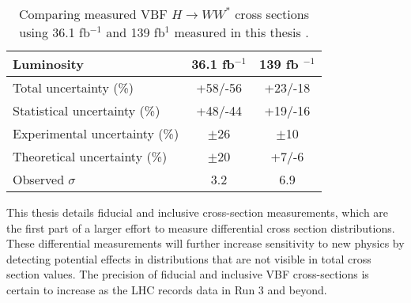 \begin{table}[!h]
  \begin{center}
    \begin{tabular}{|l|c|c|}
       \hline
        Luminosity & 36.1 fb$^{-1}$    & 139 fb $^{-1}$ \\
      \hline
	Total uncertainty (\%) & +58/-56 & +23/-18 \\
	Statistical uncertainty (\%) & +48/-44 & +19/-16 \\
        Experimental uncertainty (\%) & $\pm$26 & $\pm$10 \\
        Theoretical uncertainty (\%) & $\pm$20 & +7/-6\\
        Observed $\sigma$ & 3.2 & 6.9\\
	\hline 
    \end{tabular}
    \caption{Comparing measured VBF $H\rightarrow WW^*$ cross sections using 36.1 fb$^{-1}$ and 139 fb$^{1}$ measured in this thesis \cite{HWW2016}.}
    \label{tab:comparison}
  \end{center}
\end{table}

This thesis details fiducial and inclusive cross-section measurements, which are the first part of a larger effort to measure differential cross section distributions. These differential measurements will further increase sensitivity to new physics by detecting potential effects in distributions that are not visible in total cross section values. The precision of fiducial and inclusive VBF cross-sections is certain to increase as the LHC records data in Run 3 and beyond. 
